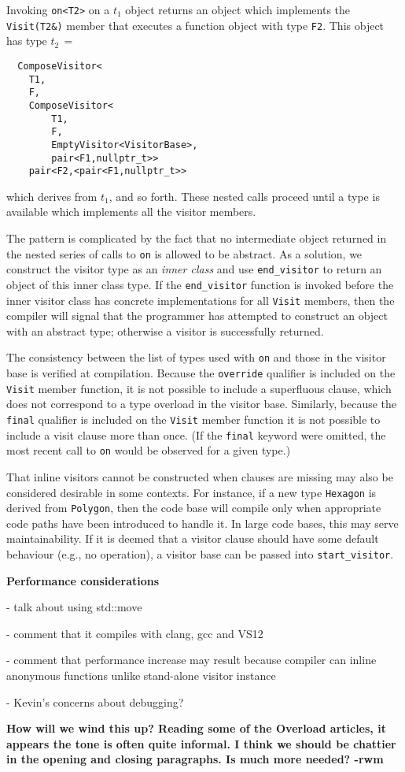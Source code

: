 \documentclass[10pt,a4paper,twocolumn]{article}
\renewcommand\section[1]{
    \begin{minipage}[c]{0.94\linewidth}
    \large \raggedright \sffamily \textbf{#1}
    \end{minipage}
}
\newcommand\mycode[1]{{\small\texttt{#1}}}
\begin{document}
Invoking \mycode{on<T2>} on a $t_1$ object returns an object which implements the \mycode{Visit(T2\&)} member that executes a function object with type \mycode{F2}. This object has type $t_2\, =$
{\small\begin{verbatim}
  ComposeVisitor<
    T1,
    F,
    ComposeVisitor<
        T1,
        F,
        EmptyVisitor<VisitorBase>,
        pair<F1,nullptr_t>>
    pair<F2,<pair<F1,nullptr_t>>
\end{verbatim}}
which derives from $t_1$, and so forth. These nested calls proceed until a type is available which implements all the visitor members.

The pattern is complicated by the fact that no intermediate object returned in the nested series of calls to \mycode{on} is allowed to be abstract. As a solution, we construct the visitor type as an \emph{inner class} and use \mycode{end\_visitor} to return an object of this inner class type. If the \mycode{end\_visitor} function is invoked before the inner visitor class has concrete implementations for all \mycode{Visit} members, then the compiler will signal that the programmer has attempted to construct an object with an abstract type; otherwise a visitor is successfully returned.

The consistency between the list of types used with \mycode{on} and those in the visitor base is verified at compilation. Because the \mycode{override} qualifier is included on the \mycode{Visit} member function, it is not possible to include a superfluous clause, which does not correspond to a type overload in the visitor base. Similarly, because the \mycode{final} qualifier is included on the \mycode{Visit} member function it is not possible to include a visit clause more than once. (If the \mycode{final} keyword were omitted, the most recent call to \mycode{on} would be observed for a given type.)

That inline visitors cannot be constructed when clauses are missing may also be considered desirable in some contexts. For instance, if a new type \mycode{Hexagon} is derived from \mycode{Polygon}, then the code base will compile only when appropriate code paths have been introduced to handle it. In large code bases, this may serve maintainability. If it is deemed that a visitor clause should have some default behaviour (e.g., no operation), a visitor base can be passed into \mycode{start\_visitor}.

\section{Performance considerations}

- talk about using std::move

- comment that it compiles with clang, gcc and VS12

- comment that performance increase may result because compiler can inline anonymous functions unlike stand-alone visitor instance
 
- Kevin's concerns about debugging?

\textbf{How will we wind this up? Reading some of the Overload articles, it appears the tone is often quite informal. I think we should be chattier in the opening and closing paragraphs. Is much more needed? -rwm}
\end{document}
